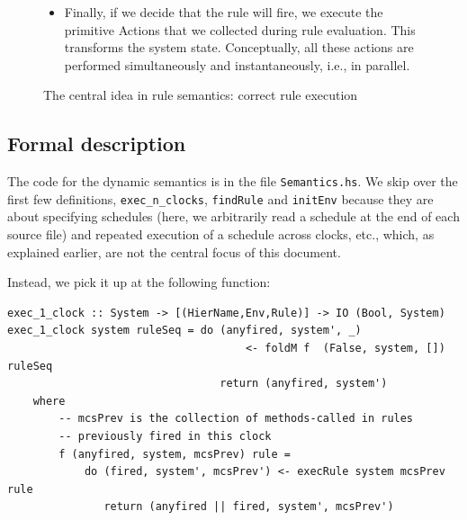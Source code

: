 \documentclass[11pt]{article}
\newcommand{\term}[1]{\texttt{#1}}
\begin{document}
\begin{figure}[htbp]
{\begin{minipage}{\textwidth}
\begin{itemize}
\begin{itemize}
  \item There is at least one \emph{inter-rule conflict}, i.e., a rule
      executed earlier in this clock invokes a method $m_1$ and this
      rule invokes a method $m_2$, and they are not allowed to be
      executed in that order.  These prohibitions are axiomatic
      properties of methods on primitive modules, and are given in a
      fixed inter-rule conflict table.


  \item The rule evaluates to \term{Unavail}.  Either the rule
      condition expression, or the condition of some method (either in
      the rule condition expression or its body), evaluates to False.

  \end{itemize}

\item Finally, if we decide that the rule will fire, we execute the
  primitive Actions that we collected during rule evaluation.  This
  transforms the system state.  Conceptually, all these actions are
  performed simultaneously and instantaneously, i.e., in parallel.

\end{itemize}

\end{minipage}}

\caption{\label{Fig_central_idea}The central idea in rule semantics: correct rule execution}
\end{figure}


\subsection{Formal description}

The code for the dynamic semantics is in the file \term{Semantics.hs}.
We skip over the first few definitions, \verb|exec_n_clocks|,
\term{findRule} and \term{initEnv} because they are about specifying
schedules (here, we arbitrarily read a schedule at the end of each
source file) and repeated execution of a schedule across clocks, etc.,
which, as explained earlier, are not the central focus of this
document.

Instead, we pick it up at the following function:

\begin{Verbatim}[frame=single, commandchars=\\\{\}]
exec_1_clock :: System -> [(HierName,Env,Rule)] -> IO (Bool, System)
exec_1_clock system ruleSeq = do (anyfired, system', _)
                                     <- foldM f  (False, system, [])  ruleSeq
                                 return (anyfired, system')
    where
        -- mcsPrev is the collection of methods-called in rules
        -- previously fired in this clock
        f (anyfired, system, mcsPrev) rule =
            do (fired, system', mcsPrev') <- execRule system mcsPrev rule
               return (anyfired || fired, system', mcsPrev')
\end{Verbatim}
\end{document}
